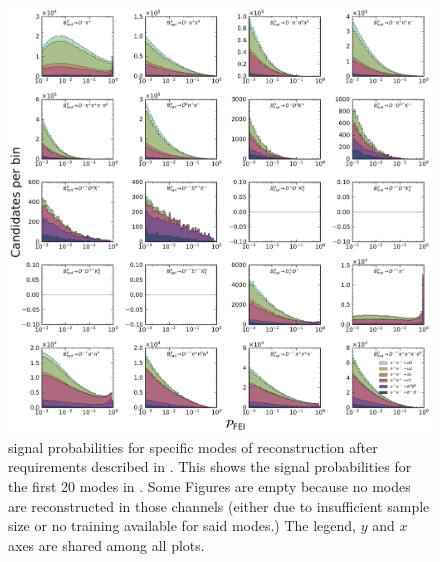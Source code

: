\begin{figure}[htbp!]
    \centering
    \includegraphics[width=1\textwidth]{figures/appendices/FEI_signal_probabilities/Bz_feiSigProbs1.pdf}
    \caption{\label{fig:feisigprobs3} \FEI signal probabilities for specific modes of \Bz reconstruction after requirements described in .
    This shows the signal probabilities for the first 20 \Bz modes in .
    Some Figures are empty because no modes are reconstructed in those channels (either due to insufficient sample size or no training available for said modes.)
    The legend, $y$ and $x$ axes are shared among all plots.
    }
\end{figure}

